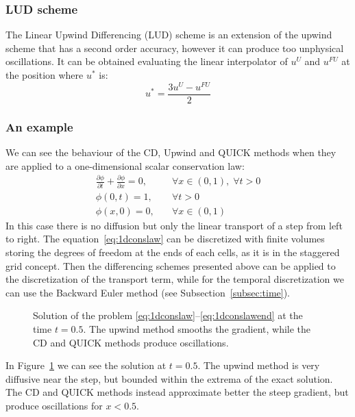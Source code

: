 \subsubsection{LUD scheme}
The Linear Upwind Differencing (LUD) scheme is an extension of the upwind 
scheme that has a second order accuracy, however it can produce too unphysical 
oscillations. It can be obtained evaluating the linear interpolator of $u^U$ 
and 
$u^{FU}$ at the position where $u^*$ is:
\begin{equation} \label{eq:lud}
u^* = \frac{3u^U - u^{FU}}{2}
\end{equation}
%
\subsubsection{An example}
We can see the behaviour of the CD, Upwind and QUICK methods when they are 
applied to a one-dimensional scalar conservation law:
\begin{align}
	\label{eq:1dconslaw} \frac{\partial \phi}{\partial t} + \frac{\partial 
	\phi}{\partial x} = 0, 
	\quad &\forall x \in (0, 1), \; \forall t > 0\\
	\phi(0, t) = 1, \quad &\forall t>0\\
	\label{eq:1dconslawend}\phi(x, 0) = 0, \quad &\forall x \in (0,1)
\end{align}
In this case there is no diffusion but only the linear transport of a step from 
left to right. The equation~\eqref{eq:1dconslaw} can be discretized with finite 
volumes storing the degrees of freedom at the ends of each cells, as it is in 
the staggered grid concept. Then the differencing schemes presented above can 
be applied to the discretization of the transport term, while for the temporal 
discretization we can use the Backward Euler method (see 
Subsection~\ref{subsec:time}).
\begin{figure}[t]
	\centering
	
	\caption[Solution of a one-dimensional scalar conservation law]{Solution of 
	the problem \eqref{eq:1dconslaw}--\eqref{eq:1dconslawend} at the time 
	$t=0.5$. The upwind method smooths the gradient, while the CD and QUICK 
	methods produce oscillations.}
	\label{fig:1dconslaw}
\end{figure}

In Figure~\ref{fig:1dconslaw} we can see the solution at $t=0.5$. The upwind 
method is very diffusive near the step, but bounded within the extrema of the 
exact solution. The CD and QUICK methods instead approximate better the steep 
gradient, but produce oscillations for $x<0.5$.
%

